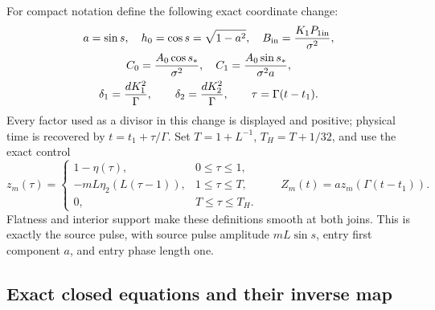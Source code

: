 For compact notation define the following exact coordinate change:
\begin{equation}\label{sr:parameters}
 \begin{gathered}
 a=\sin s,\quad h_0=\cos s=\sqrt{1-a^2},\quad
 B_{\rm in}=\frac{K_1P_{1\rm in}}{\sigma^2},\\
 C_0=\frac{A_0\cos s_*}{\sigma^2},\quad
 C_1=\frac{A_0\sin s_*}{\sigma^2a},\\
 \delta_1=\frac{dK_1^2}{\Gamma},\qquad
 \delta_2=\frac{dK_2^2}{\Gamma},\qquad
 \tau=\Gamma(t-t_1).
 \end{gathered}
\end{equation}
Every factor used as a divisor in this change is displayed and positive; physical
time is recovered by $t=t_1+\tau/\Gamma$.
Set $T=1+L^{-1}$, $T_H=T+1/32$, and use the exact control
\begin{equation}\label{sr:z}
 z_m(\tau)=
 \begin{cases}
  1-\eta(\tau),&0\leq\tau\leq1,\\
  -mL\eta_2(L(\tau-1)),&1\leq\tau\leq T,\\
  0,&T\leq\tau\leq T_H.
 \end{cases}
 \qquad Z_m(t)=a z_m(\Gamma(t-t_1)).
\end{equation}
Flatness and interior support make these definitions smooth at both
joins. This is exactly the source pulse, with source pulse amplitude
$mL\sin s$, entry first component $a$, and entry phase length one.

\subsection{Exact closed equations and their inverse map}

